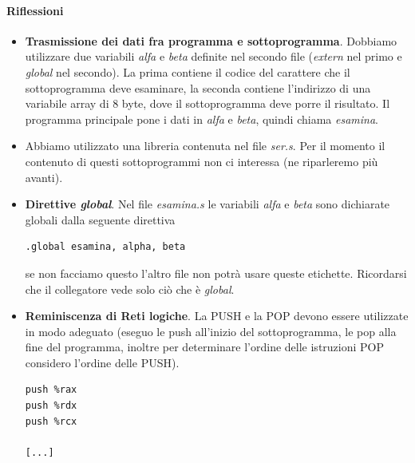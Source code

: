 \documentclass[11pt]{report}
\theoremstyle{definition}
\begin{document}
\paragraph{Riflessioni}
\begin{itemize}
	\item \textbf{Trasmissione dei dati fra programma e sottoprogramma}. Dobbiamo utilizzare due variabili \emph{alfa} e \emph{beta} definite nel secondo file (\emph{extern} nel primo e \emph{global} nel secondo). La prima contiene il codice del carattere che il sottoprogramma deve esaminare, la seconda contiene l'indirizzo di una variabile array di 8 byte, dove il sottoprogramma deve porre il risultato. Il programma principale pone i dati in \emph{alfa} e \emph{beta}, quindi chiama \emph{esamina}.
\item Abbiamo utilizzato una libreria contenuta nel file \emph{ser.s}. Per il momento il contenuto di questi sottoprogrammi non ci interessa (ne riparleremo più avanti).
\item \textbf{Direttive \emph{global}}. Nel file \emph{esamina.s} le variabili \emph{alfa} e \emph{beta} sono dichiarate globali dalla seguente direttiva
\begin{verbatim}
.global esamina, alpha, beta
\end{verbatim}
se non facciamo questo l'altro file non potrà usare queste etichette. Ricordarsi che il collegatore vede solo ciò che è \emph{global}.
\item \textbf{Reminiscenza di Reti logiche}. La PUSH e la POP devono essere utilizzate in modo adeguato (eseguo le push all'inizio del sottoprogramma, le pop alla fine del programma, inoltre per determinare l'ordine delle istruzioni POP considero l'ordine delle PUSH).
\begin{verbatim}
push %rax
push %rdx
push %rcx

[...]


\end{verbatim}
\end{itemize}
\end{document}
